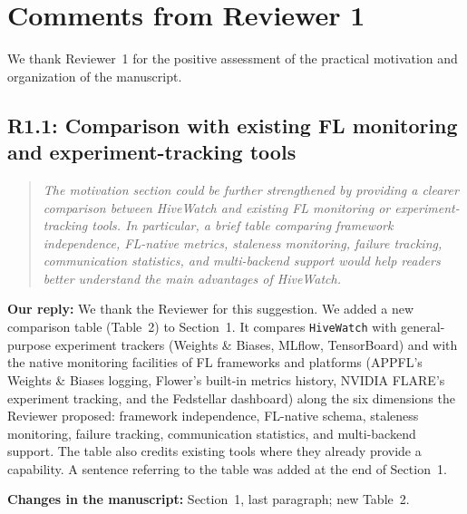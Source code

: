 \documentclass[11pt]{article}
\newenvironment{reviewer}{\begin{quote}\itshape\color{blue}}{\end{quote}}
\newcommand{\comment}[2]{\subsection*{R#1: #2}}
\newcommand{\response}{\noindent\textbf{Our reply:} }
\newcommand{\location}[1]{\noindent\textbf{Changes in the manuscript:} #1}
\newcommand{\HW}{\texttt{HiveWatch}}
\begin{document}
\section*{Comments from Reviewer 1}

We thank Reviewer~1 for the positive assessment of the practical motivation and organization of the manuscript.

\comment{1.1}{Comparison with existing FL monitoring and experiment-tracking tools}
\begin{reviewer}
The motivation section could be further strengthened by providing a clearer comparison between HiveWatch and existing FL monitoring or experiment-tracking tools. In particular, a brief table comparing framework independence, FL-native metrics, staleness monitoring, failure tracking, communication statistics, and multi-backend support would help readers better understand the main advantages of HiveWatch.
\end{reviewer}
\response We thank the Reviewer for this suggestion. We added a new comparison table (Table~2) to Section~1. It compares \HW{} with general-purpose experiment trackers (Weights \& Biases, MLflow, TensorBoard) and with the native monitoring facilities of FL frameworks and platforms (APPFL's Weights \& Biases logging, Flower's built-in metrics history, NVIDIA FLARE's experiment tracking, and the Fedstellar dashboard) along the six dimensions the Reviewer proposed: framework independence, FL-native schema, staleness monitoring, failure tracking, communication statistics, and multi-backend support. The table also credits existing tools where they already provide a capability. A sentence referring to the table was added at the end of Section~1.

\location{Section~1, last paragraph; new Table~2.}
\end{document}
